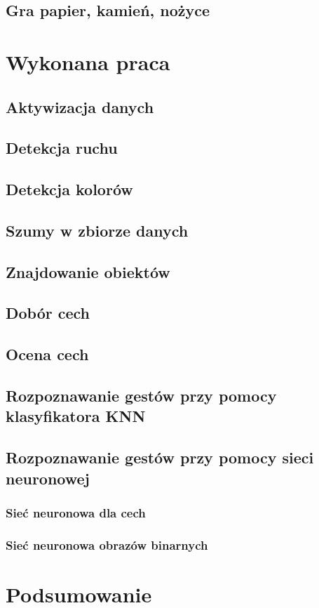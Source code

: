 \documentclass[a4paper,12pt,twoside,openany]{report}
\begin{document}
\section{Gra papier, kamień, nożyce}

\chapter{Wykonana praca}
\section{Aktywizacja danych}
\section{Detekcja ruchu}
\section{Detekcja kolorów}
\section{Szumy w zbiorze danych}
\section{Znajdowanie obiektów}
\section{Dobór cech}
\section{Ocena cech}
\section{Rozpoznawanie gestów przy pomocy klasyfikatora KNN}
\section{Rozpoznawanie gestów przy pomocy sieci neuronowej}
\subsection{Sieć neuronowa dla cech}
\subsection{Sieć neuronowa obrazów binarnych}
\chapter{Podsumowanie}





\appendix



\begin{thebibliography}{99}


\end{thebibliography}
\end{document}
